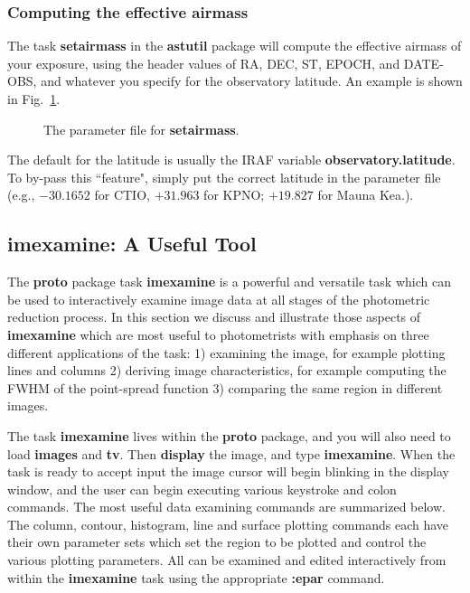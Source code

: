 \subsubsection{Computing the effective airmass}
The task {\bf setairmass} in the {\bf astutil} package will compute
the effective airmass of your exposure, using the header values of RA,
DEC, ST, EPOCH, and DATE-OBS, and whatever you specify for the observatory
latitude.  An example is shown in Fig.~\ref{setairmass}.
\begin{figure}
\vspace{2.5in}
\caption{\label{setairmass} The parameter file for {\bf setairmass}.}
\end{figure}
The default for the latitude is usually the IRAF
variable {\bf observatory.latitude}.  To by-pass this ``feature", simply
put the correct latitude in the parameter file
(e.g., $-30.1652$ for CTIO,
$+31.963$ for KPNO; $+19.827$ for Mauna Kea.).
 
\subsection{{\bf imexamine:} A Useful Tool}
 
The {\bf proto} package task {\bf imexamine} is a powerful and versatile task
which can be used to interactively examine image data at all stages of
the photometric reduction process. In this section we discuss and
illustrate those aspects of {\bf imexamine} which are  most useful to
photometrists with emphasis on three different applications of the task:
1) examining the image, for example plotting lines and columns
2) deriving  image characteristics, for example computing the
FWHM of the point-spread function 3) comparing the same region
in different images.
 
The task 
{\bf imexamine} lives within the {\bf proto} package, and you will also need
to load {\bf images} and {\bf tv}.  Then 
{\bf display}  the image, and type {\bf imexamine}.
When the task is ready to accept input the image cursor will begin blinking
in the display window, and the user can begin executing various keystroke
and colon commands.  The most useful data examining commands are summarized
below.  The column, contour, histogram, line and surface plotting commands
each have their own parameter sets which set the region to be plotted and
control the various plotting parameters. All can be examined and edited
interactively from within the {\bf imexamine} task using the
appropriate {\bf :epar} command.
 
